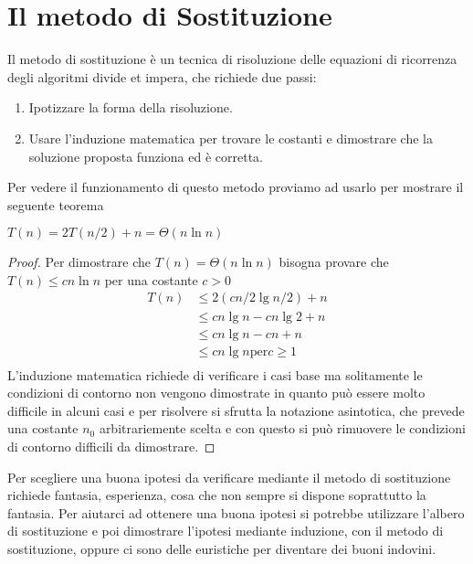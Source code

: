 \section{Il metodo di Sostituzione}
Il metodo di sostituzione è un tecnica di risoluzione delle equazioni di ricorrenza
degli algoritmi divide et impera, che richiede due passi:
\begin{enumerate}
    \item Ipotizzare la forma della risoluzione.
    \item Usare l'induzione matematica per trovare le costanti e dimostrare che
          la soluzione proposta funziona ed è corretta.
\end{enumerate}
Per vedere il funzionamento di questo metodo proviamo ad usarlo per mostrare il seguente teorema
\begin{thm}
    $T(n) = 2T(n/2) + n = \Theta(n \ln n)$
\end{thm}
\begin{proof}
Per dimostrare che $T(n) = \Theta(n \ln n)$ bisogna provare che $T(n) \leq cn \ln n$ per una costante $c > 0$
\begin{equation*}
\begin{split}
T(n) & \leq 2(cn/2 \lg n/2) + n \\
     & \leq cn \lg n - cn \lg 2 + n\\
     & \leq cn \lg n - cn + n \\
     & \leq cn \lg n \text{per} c \geq 1\\
\end{split}
\end{equation*}
L'induzione matematica richiede di verificare i casi base ma solitamente le condizioni di contorno non vengono dimostrate in quanto può essere molto difficile 
in alcuni casi e per risolvere si sfrutta la notazione asintotica, che prevede una costante $n_0$ arbitrariemente scelta e con questo si può rimuovere le condizioni
di contorno difficili da dimostrare.
\end{proof}

Per scegliere una buona ipotesi da verificare mediante il metodo di sostituzione
richiede fantasia, esperienza, cosa che non sempre si dispone soprattutto la fantasia.\newline
Per aiutarci ad ottenere una buona ipotesi si potrebbe utilizzare l'albero di sostituzione
e poi dimostrare l'ipotesi mediante induzione, con il metodo di sostituzione, oppure
ci sono delle euristiche per diventare dei buoni indovini.

